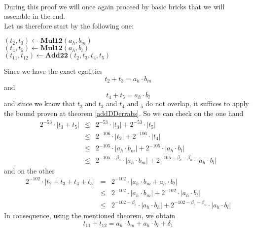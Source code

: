 \documentclass[a4paper,10pt,twoside]{article}
\newenvironment{proof}[1][Proof]{\begin{trivlist}
\item[\hskip \labelsep {\bfseries #1}]}{\end{trivlist}}
\newcommand{\hi}{\ensuremath{\mathit{h}}}
\newcommand{\mi}{\ensuremath{\mathit{m}}}
\newcommand{\lo}{\ensuremath{\mathit{l}}}
\newcommand{\mAddDD}{\ensuremath{\mathbf{Add22}}}
\newcommand{\mMul}{\ensuremath{\mathbf{Mul12}}}
\begin{document}
\begin{proof} ~ \\
During this proof we will once again proceed by basic bricks that we will assemble in the end.\\
Let us therefore start by the following one:
\begin{center}
\begin{minipage}[b]{60mm}
$\left( t_2, t_3 \right) \gets \mMul\left( a_\hi, b_\mi \right)$ \\
$\left( t_4, t_5 \right) \gets \mMul\left( a_\hi, b_\lo \right)$ \\
$\left( t_{11}, t_{12} \right) \gets \mAddDD\left( t_2, t_3, t_4, t_5 \right)$
\end{minipage}
\end{center}
Since we have the exact egalities
$$t_2 + t_3 = a_\hi \cdot b_\mi$$
and
$$t_4 + t_5 = a_\hi \cdot b_\lo$$
and since we know that $t_2$ and $t_3$ and $t_4$ and $_5$ do not overlap,
it suffices to apply the bound proven at theorem \ref{addDDerrabs}.
So we can check on the one hand
\begin{eqnarray*}
2^{-53} \cdot \left \vert t_3 + t_5 \right \vert & \leq & 2^{-53} \cdot \left \vert t_3 \right \vert + 2^{-53} \cdot \left \vert t_5 \right \vert \\
& \leq & 2^{-106} \cdot \left \vert t_2 \right \vert + 2^{-106} \cdot \left \vert t_4 \right \vert \\
& \leq & 2^{-105} \cdot \left \vert a_\hi \cdot b_\mi \right \vert + 2^{-105} \cdot \left \vert a_\hi \cdot b_\lo \right \vert \\
& \leq & 2^{-105-\beta_o} \cdot \left \vert a_\hi \cdot b_\mi \right \vert + 2^{-105-\beta_o-\beta_u} \cdot \left \vert a_\hi \cdot b_\lo \right \vert
\end{eqnarray*}
and on the other
\begin{eqnarray*}
2^{-102} \cdot \left \vert t_2 + t_3 + t_4 + t_5 \right \vert & = &
2^{-102} \cdot \left \vert a_\hi \cdot b_\mi + a_\hi \cdot b_\lo \right \vert \\
& \leq & 2^{-102} \cdot \left \vert a_\hi \cdot b_\mi \right \vert + 2^{-102} \cdot \left \vert a_\hi \cdot b_\lo \right \vert \\
& \leq & 2^{-102-\beta_o} \cdot \left \vert a_\hi \cdot b_\hi \right \vert + 2^{-102-\beta_o-\beta_u} \cdot \left \vert a_\hi \cdot b_\lo \right \vert
\end{eqnarray*}
In consequence, using the mentioned theorem, we obtain
$$t_{11} + t_{12} = a_\hi \cdot b_\mi + a_\hi \cdot b_\lo + \delta_1$$

\end{proof}
\end{document}
